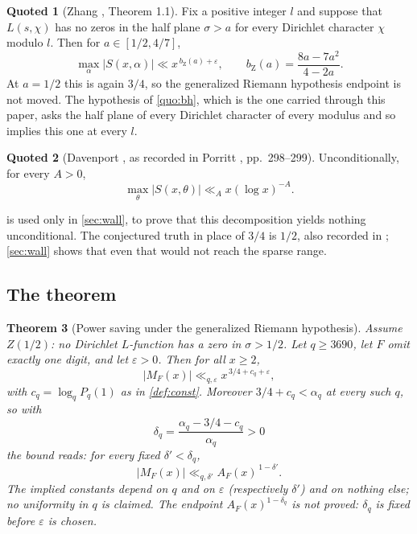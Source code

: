 \documentclass[11pt]{amsart}
\newtheorem{theorem}{Theorem}[section]
\theoremstyle{definition}
\newtheorem{quoted}[theorem]{Quoted}
\theoremstyle{remark}
\begin{document}
\begin{quoted}[Zhang \cite{zhang}, Theorem 1.1]
\label{quo:zhang}
Fix a positive integer $l$ and suppose that $L(s,\chi)$ has no zeros in the half plane $\sigma > a$ for every Dirichlet character $\chi$ modulo $l$. Then for $a \in [1/2, 4/7]$,
\[
  \max_{\alpha} |S(x, \alpha)| \ll x^{\,b_{\mathrm Z}(a) + \varepsilon},
  \qquad b_{\mathrm Z}(a) = \frac{8a - 7a^2}{4 - 2a} .
\]
At $a = 1/2$ this is again $3/4$, so the generalized Riemann hypothesis endpoint is not moved. The hypothesis of \cref{quo:bh}, which is the one carried through this paper, asks the half plane of every Dirichlet character of every modulus and so implies this one at every $l$.
\end{quoted}

\begin{quoted}[Davenport \cite{davenport}, as recorded in Porritt \cite{porritt}, pp.\ 298--299]
\label{quo:davenport}
Unconditionally, for every $A > 0$,
\[
  \max_{\theta} |S(x,\theta)| \ll_A x (\log x)^{-A} .
\]
\end{quoted}

 is used only in \cref{sec:wall}, to prove that this decomposition yields nothing unconditional. The conjectured truth in place of $3/4$ is $1/2$, also recorded in \cite{porritt}; \cref{sec:wall} shows that even that would not reach the sparse range.

\subsection*{The theorem}

\begin{theorem}[Power saving under the generalized Riemann hypothesis]
\label{thm:main}
Assume $Z(1/2)$: no Dirichlet $L$-function has a zero in $\sigma > 1/2$. Let $q \ge 3690$, let $F$ omit exactly one digit, and let $\varepsilon > 0$. Then for all $x \ge 2$,
\[
  |M_F(x)| \ll_{q,\varepsilon} x^{\,3/4 + c_q + \varepsilon} ,
\]
with $c_q = \log_q P_q(1)$ as in \cref{def:const}. Moreover $3/4 + c_q < \alpha_q$ at every such $q$, so with
\[
  \delta_q = \frac{\alpha_q - 3/4 - c_q}{\alpha_q} > 0
\]
the bound reads: for every fixed $\delta' < \delta_q$,
\[
  |M_F(x)| \ll_{q,\delta'} A_F(x)^{\,1 - \delta'} .
\]
The implied constants depend on $q$ and on $\varepsilon$ (respectively $\delta'$) and on nothing else; no uniformity in $q$ is claimed. The endpoint $A_F(x)^{1-\delta_q}$ is \emph{not} proved: $\delta_q$ is fixed before $\varepsilon$ is chosen.
\end{theorem}
\end{document}
